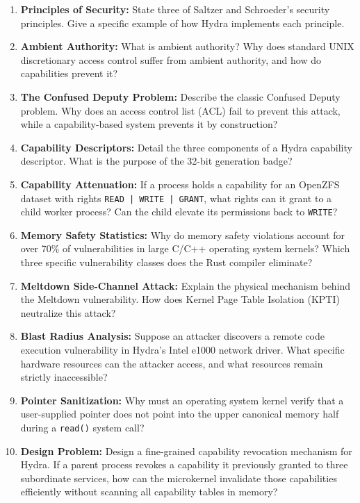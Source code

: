 \begin{enumerate}
    \item \textbf{Principles of Security:} State three of Saltzer and Schroeder's security principles. Give a specific example of how Hydra implements each principle.
    \item \textbf{Ambient Authority:} What is ambient authority? Why does standard UNIX discretionary access control suffer from ambient authority, and how do capabilities prevent it?
    \item \textbf{The Confused Deputy Problem:} Describe the classic Confused Deputy problem. Why does an access control list (ACL) fail to prevent this attack, while a capability-based system prevents it by construction?
    \item \textbf{Capability Descriptors:} Detail the three components of a Hydra capability descriptor. What is the purpose of the 32-bit generation badge?
    \item \textbf{Capability Attenuation:} If a process holds a capability for an OpenZFS dataset with rights \texttt{READ | WRITE | GRANT}, what rights can it grant to a child worker process? Can the child elevate its permissions back to \texttt{WRITE}?
    \item \textbf{Memory Safety Statistics:} Why do memory safety violations account for over 70\% of vulnerabilities in large C/C++ operating system kernels? Which three specific vulnerability classes does the Rust compiler eliminate?
    \item \textbf{Meltdown Side-Channel Attack:} Explain the physical mechanism behind the Meltdown vulnerability. How does Kernel Page Table Isolation (KPTI) neutralize this attack?
    \item \textbf{Blast Radius Analysis:} Suppose an attacker discovers a remote code execution vulnerability in Hydra's Intel e1000 network driver. What specific hardware resources can the attacker access, and what resources remain strictly inaccessible?
    \item \textbf{Pointer Sanitization:} Why must an operating system kernel verify that a user-supplied pointer does not point into the upper canonical memory half during a \texttt{read()} system call?
    \item \textbf{Design Problem:} Design a fine-grained capability revocation mechanism for Hydra. If a parent process revokes a capability it previously granted to three subordinate services, how can the microkernel invalidate those capabilities efficiently without scanning all capability tables in memory?
\end{enumerate}
